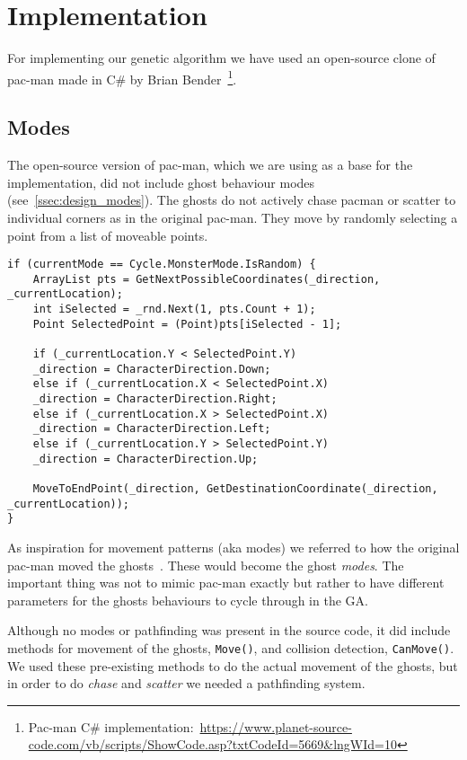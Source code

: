 
\section{Implementation} \label{sec:implementation}
For implementing our genetic algorithm we have used an open-source clone of pac-man made in C\# by Brian Bender~\footnote{Pac-man C\# implementation:~\url{https://www.planet-source-code.com/vb/scripts/ShowCode.asp?txtCodeId=5669&lngWId=10}}.

\subsection{Modes}
The open-source version of pac-man, which we are using as a base for the implementation, did not include ghost behaviour modes (see~\ref{ssec:design_modes}).
The ghosts do not actively chase pacman or scatter to individual corners as in the original pac-man.
They move by randomly selecting a point from a list of moveable points.

\begin{lstlisting}[caption=random movement, label=lst:imp1]
if (currentMode == Cycle.MonsterMode.IsRandom) {
	ArrayList pts = GetNextPossibleCoordinates(_direction, _currentLocation);
	int iSelected = _rnd.Next(1, pts.Count + 1);
	Point SelectedPoint = (Point)pts[iSelected - 1];

	if (_currentLocation.Y < SelectedPoint.Y)
	_direction = CharacterDirection.Down;
	else if (_currentLocation.X < SelectedPoint.X)
	_direction = CharacterDirection.Right;
	else if (_currentLocation.X > SelectedPoint.X)
	_direction = CharacterDirection.Left;
	else if (_currentLocation.Y > SelectedPoint.Y)
	_direction = CharacterDirection.Up;

	MoveToEndPoint(_direction, GetDestinationCoordinate(_direction, _currentLocation));
}
\end{lstlisting}

As inspiration for movement patterns (aka modes) we referred to how the original pac-man moved the ghosts~\autocite{Mateas2003}.
These would become the ghost \emph{modes}.
The important thing was not to mimic pac-man exactly but rather to have different parameters for the ghosts behaviours to cycle through in the GA.

Although no modes or pathfinding was present in the source code, it did include methods for movement of the ghosts, \texttt{Move()}, and collision detection, \texttt{CanMove()}.
We used these pre-existing methods to do the actual movement of the ghosts, but in order to do \emph{chase} and \emph{scatter} we needed a pathfinding system.

